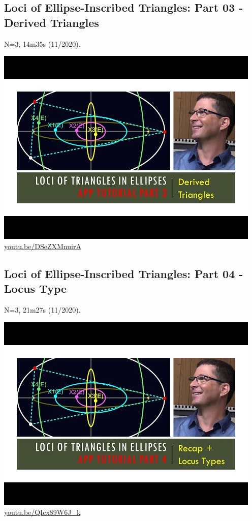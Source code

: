 \documentclass[12pt]{amsart}
\begin{document}
\subsection{Loci of Ellipse-Inscribed Triangles: Part 03 - Derived Triangles}
\label{vid:DSeZXMnuirA}
\noindent N=3, 14m35s (11/2020). 
\begin{center}\includegraphics[width=.5\textwidth]{pics/DSeZXMnuirA.jpg} \\ 
\href{https://youtu.be/DSeZXMnuirA}{\url{youtu.be/DSeZXMnuirA}}\end{center}
% 

\subsection{Loci of Ellipse-Inscribed Triangles: Part 04 - Locus Type}
\label{vid:QIcx89W6J_k}
\noindent N=3, 21m27s (11/2020). 
\begin{center}\includegraphics[width=.5\textwidth]{pics/QIcx89W6J_k.jpg} \\ 
\href{https://youtu.be/QIcx89W6J_k}{\url{youtu.be/QIcx89W6J\_k}}\end{center}
% 
\end{document}
